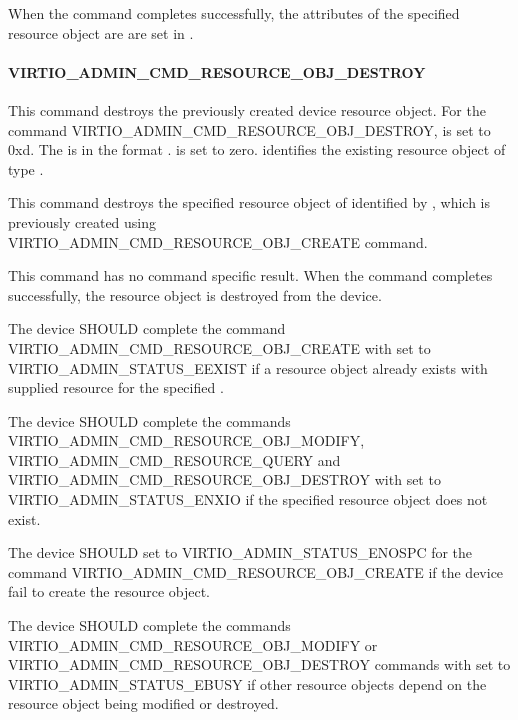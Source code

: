 When the command completes successfully, the attributes of the specified
resource object are are set in .

\paragraph{VIRTIO_ADMIN_CMD_RESOURCE_OBJ_DESTROY}
\label{par:Basic Facilities of a Virtio Device / Device groups / Group administration commands / Device resource objects / VIRTIO_ADMIN_CMD_RESOURCE_OBJ_DESTROY}

This command destroys the previously created device resource object.
For the command VIRTIO_ADMIN_CMD_RESOURCE_OBJ_DESTROY,  is set to 0xd.
The  is in the format
.
 is set to zero.
 identifies the existing resource object of type .

This command destroys the specified resource object of  identified
by , which is previously created using
VIRTIO_ADMIN_CMD_RESOURCE_OBJ_CREATE command.

This command has no command specific result.
When the command completes successfully, the resource object is destroyed from the device.


The device SHOULD complete the command VIRTIO_ADMIN_CMD_RESOURCE_OBJ_CREATE
with  set to VIRTIO_ADMIN_STATUS_EEXIST if a resource object already exists
with supplied resource  for the specified .

The device SHOULD complete the commands VIRTIO_ADMIN_CMD_RESOURCE_OBJ_MODIFY,
VIRTIO_ADMIN_CMD_RESOURCE_QUERY and
VIRTIO_ADMIN_CMD_RESOURCE_OBJ_DESTROY with  set to
VIRTIO_ADMIN_STATUS_ENXIO if the specified resource object does not exist.

The device SHOULD set  to VIRTIO_ADMIN_STATUS_ENOSPC for the
command VIRTIO_ADMIN_CMD_RESOURCE_OBJ_CREATE if the device fail to create the
resource object.

The device SHOULD complete the commands VIRTIO_ADMIN_CMD_RESOURCE_OBJ_MODIFY or
VIRTIO_ADMIN_CMD_RESOURCE_OBJ_DESTROY commands with  set to
VIRTIO_ADMIN_STATUS_EBUSY if other resource objects depend on the resource object
being modified or destroyed.

